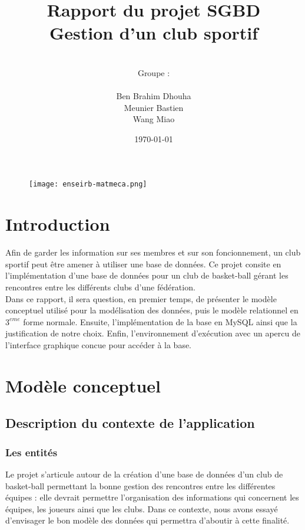 \documentclass{article}
\date{\vspace{3 cm} \today}
\author{\vspace{4 cm} \\ Groupe :\\ \\Ben Brahim Dhouha\\Meunier Bastien\\Wang Miao }
\title{Rapport du projet SGBD \\ Gestion d'un club sportif}
\begin{document}
\thispagestyle{empty}
\begin{figure}
\texttt{[image: enseirb-matmeca.png]}
\end{figure}
\maketitle

\newpage


\section*{Introduction}


Afin de garder les information sur ses membres et sur son foncionnement, un club sportif peut être amener à utiliser une base de données. Ce projet consite en l'implémentation d'une base de données pour un club de basket-ball gérant les rencontres entre les différents clubs d'une fédération. \\

Dans ce rapport, il sera question, en premier temps, de présenter le modèle conceptuel utilisé pour la modélisation des données, puis le modèle relationnel en $3^{eme}$ forme normale. Ensuite, l'implémentation de la base en MySQL ainsi que la justification de notre choix. Enfin, l'environnement d'exécution avec un apercu de l'interface graphique concue pour accéder à la base. 


\newpage
\tableofcontents

\newpage
\section{Modèle conceptuel}

\subsection{Description du contexte de l'application}

\subsubsection*{Les entités}
Le projet s’articule autour de la création d’une base de données d’un club de basket-ball permettant la bonne gestion des rencontres entre les différentes équipes : elle devrait permettre l’organisation des informations qui concernent les équipes, les joueurs ainsi que les clubs.
Dans ce contexte, nous avons essayé d’envisager le bon modèle des données qui permettra d’aboutir à cette finalité.
\end{document}
